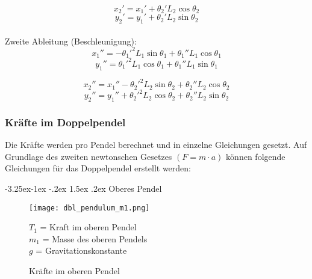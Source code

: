 \documentclass[12pt]{article}
\makeatletter
\numberwithin{equation}{subsection}
\renewcommand\paragraph{\@startsection{paragraph}{4}{\z@}%
  {-3.25ex\@plus -1ex \@minus -.2ex}%
  {1.5ex \@plus .2ex}%
  {\normalfont\normalsize\bfseries}}
\makeatother
\begin{document}
\begin{equation} \label{eq:velocity:2_1}
	x_2' = x_1' + \theta_2' L_2\cos\theta_2
\end{equation}
\begin{equation} \label{eq:velocity:2_2}
	y_2' = y_1' + \theta_2' L_2\sin\theta_2
\end{equation}
\
\\
Zweite Ableitung (Beschleunigung):
\begin{equation} \label{eq:acceleration:1_1}
	x_1'' = -{\theta_1'}^2 L_1 \sin\theta_1 + \theta_1'' L_1 \cos\theta_1
\end{equation}
\begin{equation} \label{eq:acceleration:1_2}
	y_1'' = {\theta_1'}^2 L_1 \cos\theta_1 + \theta_1'' L_1 \sin\theta_1
\end{equation}

\begin{equation} \label{eq:acceleration:2_1}
	x_2'' = x_1'' - {\theta_2'}^2 L_2\sin\theta_2 + \theta_2'' L_2 \cos\theta_2
\end{equation}
\begin{equation} \label{eq:acceleration:2_2}
	y_2'' = y_1'' + {\theta_2'}^2 L_2\cos\theta_2 + \theta_2'' L_2 \sin\theta_2
\end{equation}
\clearpage

\subsubsection{Kräfte im Doppelpendel}
Die Kräfte werden pro Pendel berechnet und in einzelne Gleichungen gesetzt. Auf Grundlage des zweiten newtonschen Gesetzes $(F = m \cdot a)$ können folgende Gleichungen für das Doppelpendel erstellt werden:

\paragraph{Oberes Pendel}
\begin{figure}[H]
	\begin{minipage}[!b]{0.5\textwidth}
		\centering
		\texttt{[image: dbl\_pendulum\_m1.png]}
		\caption[Kräfte im oberen Pendel]{Kräfte im oberen Pendel \citep{neumann04}}
		\label{fig:force_1}
	\end{minipage}
	\begin{minipage}[!t]{\textwidth}
		\vspace{0pt}\raggedright
		$T_1$ = Kraft im oberen Pendel\\
		$m_1$ = Masse des oberen Pendels\\
		$g$ = Gravitationskonstante
	\end{minipage}
\end{figure}
\end{document}
